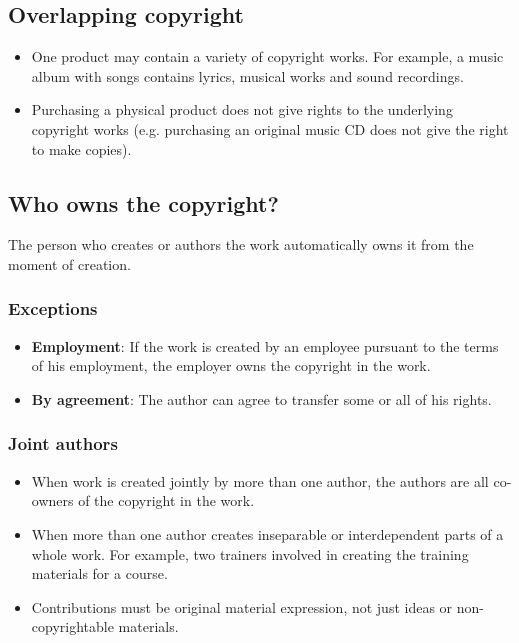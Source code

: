 \documentclass[11pt]{article}
\begin{document}
\subsection{Overlapping copyright}
\label{sec:org7a99539}
\begin{itemize}
\item One product may contain a variety of copyright works. For example, a music album with songs contains lyrics, musical works and sound recordings.
\item Purchasing a physical product does not give rights to the underlying copyright works (e.g. purchasing an original music CD does not give the right to make copies).
\end{itemize}

\subsection{Who owns the copyright?}
\label{sec:orgde75505}
The person who creates or authors the work automatically owns it from the moment of creation.

\subsubsection{Exceptions}
\label{sec:org3ea7e34}
\begin{itemize}
\item \textbf{Employment}: If the work is created by an employee pursuant to the terms of his employment, the employer owns the copyright in the work.
\item \textbf{By agreement}: The author can agree to transfer some or all of his rights.
\end{itemize}

\subsubsection{Joint authors}
\label{sec:org4dc2327}
\begin{itemize}
\item When work is created jointly by more than one author, the authors are all co-owners of the copyright in the work.
\item When more than one author creates inseparable or interdependent parts of a whole work. For example, two trainers involved in creating the training materials for a course.
\item Contributions must be original material expression, not just ideas or non-copyrightable materials.
\end{itemize}
\end{document}
